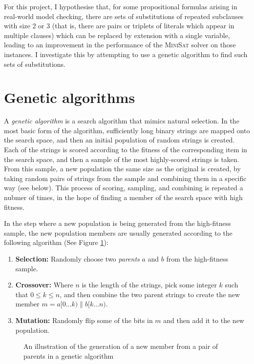 \documentclass[pdftex,11pt,a4]{article}
\begin{document}
For this project, I hypothesise that, for some propositional formulas arising in real-world model checking, there are sets of substitutions of repeated subclauses with size 2 or 3 (that is, there are pairs or triplets of literals which appear in multiple clauses) which can be replaced by extension with a single variable, leading to an improvement in the performance of the \textsc{MiniSat} solver on those instances. I investigate this by attempting to use a genetic algorithm to find such sets of substitutions.

\section{Genetic algorithms}

A \emph{genetic algorithm} is a search algorithm that mimics natural selection. In the most basic form of the algorithm, sufficiently long binary strings are mapped onto the search space, and then an initial population of random strings is created. Each of the strings is scored according to the fitness of the corresponding item in the search space, and then a sample of the most highly-scored strings is taken. From this sample, a new population the same size as the original is created, by taking random pairs of strings from the sample and combining them in a specific way (see below). This process of scoring, sampling, and combining is repeated a nubmer of times, in the hope of finding a member of the search space with high fitness.

In the step where a new population is being generated from the high-fitness sample, the new population members are usually generated according to the following algorithm (See Figure \ref{fig:genetic-algo}):

\begin{enumerate}
  \item {\bf Selection:} Randomly choose two \emph{parents} $a$ and $b$ from the high-fitness sample.
  \item {\bf Crossover:} Where $n$ is the length of the strings, pick some integer $k$ such that $0 \leq k \leq n$, and then combine the two parent strings to create the new member $m = a[0 \ldots k) \parallel b[k \ldots n)$.
  \item {\bf Mutation:} Randomly flip some of the bits in $m$ and then add it to the new population.
\end{enumerate}

\begin{figure}[h]
  
  \caption{An illustration of the generation of a new member from a pair of parents in a genetic algorithm}
  \label{fig:genetic-algo}
\end{figure}
\end{document}
